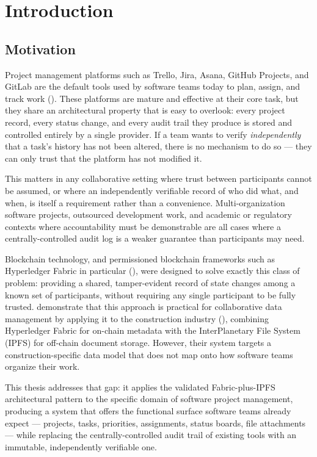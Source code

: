 \chapter{Introduction}
\label{ch:introduction}

\section{Motivation}
\label{sec:motivation}

Project management platforms such as Trello, Jira, Asana, GitHub Projects, and GitLab are the default tools used by software teams today to plan, assign, and track work (). These platforms are mature and effective at their core task, but they share an architectural property that is easy to overlook: every project record, every status change, and every audit trail they produce is stored and controlled entirely by a single provider. If a team wants to verify \emph{independently} that a task's history has not been altered, there is no mechanism to do so — they can only trust that the platform has not modified it.

This matters in any collaborative setting where trust between participants cannot be assumed, or where an independently verifiable record of who did what, and when, is itself a requirement rather than a convenience. Multi-organization software projects, outsourced development work, and academic or regulatory contexts where accountability must be demonstrable are all cases where a centrally-controlled audit log is a weaker guarantee than participants may need.

Blockchain technology, and permissioned blockchain frameworks such as Hyperledger Fabric in particular (), were designed to solve exactly this class of problem: providing a shared, tamper-evident record of state changes among a known set of participants, without requiring any single participant to be fully trusted. \textcite{adel2023} demonstrate that this approach is practical for collaborative data management by applying it to the construction industry (), combining Hyperledger Fabric for on-chain metadata with the InterPlanetary File System (IPFS) for off-chain document storage. However, their system targets a construction-specific data model that does not map onto how software teams organize their work.

This thesis addresses that gap: it applies the validated Fabric-plus-IPFS architectural pattern to the specific domain of software project management, producing a system that offers the functional surface software teams already expect — projects, tasks, priorities, assignments, status boards, file attachments — while replacing the centrally-controlled audit trail of existing tools with an immutable, independently verifiable one.

